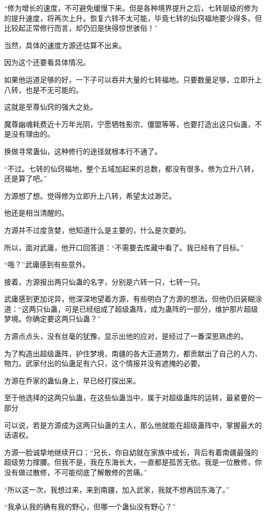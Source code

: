 \begin{this_body}
“修为增长的速度，不可避免缓慢下来。但是各种境界提升之后，七转层级的修为的提升速度，将再次上升。恢复六转不太可能，毕竟七转的仙窍福地要少得多。但比较起正常修行而言，却仍旧是快得惊世骇俗！”

当然，具体的速度方源还估算不出来。

因为这个还要看具体情况。

如果他运道足够的好，一下子可以吞并大量的七转福地。只要数量足够，立即升上八转，也是不无可能的。

这就是至尊仙窍的强大之处。

魔尊幽魂耗费近十万年光阴，宁愿牺牲影宗、僵盟等等，也要打造出这只仙蛊，不是没有理由的。

换做寻常蛊仙，这种修行的途径就根本行不通了。

“不过。七转的仙窍福地，整个五域加起来的总数，都没有很多。修为立升八转，还是算了吧。”

方源想了想。觉得修为立即升上八转，希望太过渺茫。

他还是相当清醒的。

方源并不过度贪婪，他知道什么是主要的，什么是次要的。

所以，面对武庸，他开口回答道：“不需要去库藏中看了。我已经有了目标。”

“哦？”武庸感到有些意外。

接着，方源报出两只仙蛊的名字，分别是六转一只，七转一只。

武庸感到更加诧异，他深深地望着方源，有些明白了方源的想法。但他仍旧装糊涂道：“这两只仙蛊，可是已经组成了超级蛊阵，成为蛊阵的一部分，维护那片超级梦境。你确定要这两只仙蛊？”

方源点点头，没有丝毫的犹豫，显示出他的应对，是经过了一番深思熟虑的。

为了构造出超级蛊阵，护住梦境，南疆的各大正道势力，都贡献出了自己的人力、物力。武家付出的仙蛊足有六只，这个情报并没有遮掩的必要。

方源在乔家的蛊仙身上，早已经打探出来。

至于他选择的这两只仙蛊，在这些仙蛊当中，属于对超级蛊阵的运转，最紧要的一部分

可以说，若是方源成为这两只仙蛊的主人，那么他就能在超级蛊阵中，掌握最大的话语权。

方源一脸诚挚地继续开口：“兄长，你自幼就在家族中成长，背后有着南疆最强的超级势力撑腰。但我不是，我在东海长大，一直都是孤苦无依。我是一位散修，你没有做过散修，不可能彻底了解散修的苦痛。”

“所以这一次，我想过来，来到南疆，加入武家，我就不想再回东海了。”

“我承认我的确有我的野心，但哪一个蛊仙没有野心？”


\end{this_body}
